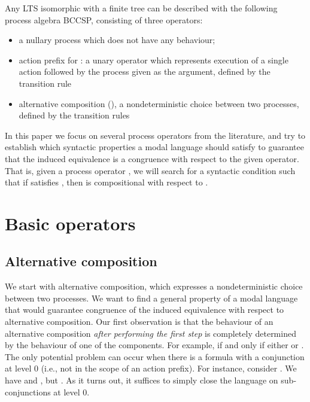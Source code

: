 \documentclass{eptcs}
\begin{document}
Any LTS isomorphic with a finite tree can be described with the following process algebra BCCSP, consisting of three operators:
	
\begin{itemize}
\item a nullary process  which does not have any behaviour;
\item action prefix  for : a unary operator which represents execution of a single action followed by the process given as the argument, defined by the transition rule
\begin{center}

\end{center}
\item alternative composition (), a nondeterministic choice between two processes, defined by the transition rules
\begin{center}

\end{center}
\end{itemize}
	
In this paper we focus on several process operators from the literature, and try to establish which syntactic properties a modal language  should satisfy to guarantee that the induced equivalence is a congruence with respect to the given operator. That is, given a process operator , we will search for a syntactic condition  such that if  satisfies , then  is compositional with respect to .


\section{Basic operators}

\subsection {Alternative composition}

We start with alternative composition, which expresses a nondeterministic choice between two processes. We want to find a general property of a modal language that would guarantee congruence of the induced equivalence with respect to alternative composition. Our first observation is that the behaviour of an alternative composition  \textit{after performing the first step} is completely determined by the behaviour of one of the components. For example,  if and only if either  or . The only potential problem can occur when there is a formula with a conjunction at level 0 (i.e., not in the scope of an action prefix). For instance, consider .  We have  and , but . As it turns out, it suffices to simply close the language on sub-conjunctions at level 0.
  
\end{document}
